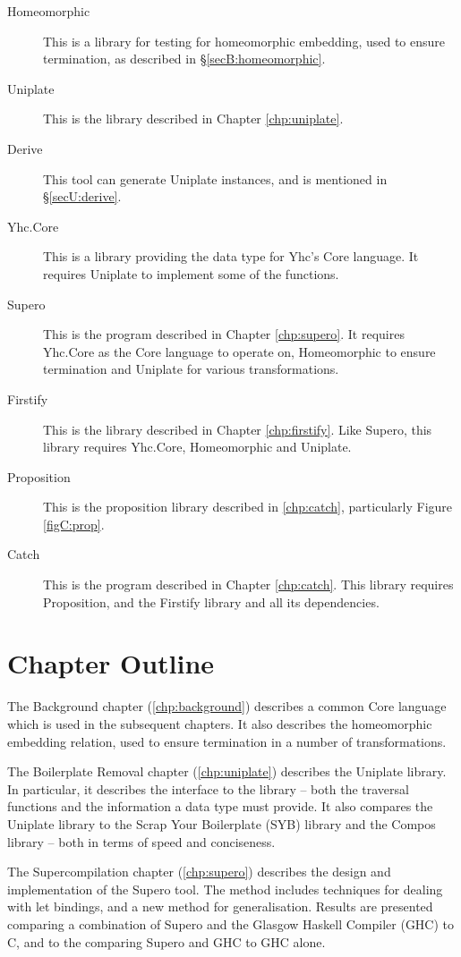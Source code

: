 \begin{description}
\item[Homeomorphic] This is a library for testing for homeomorphic embedding, used to ensure termination, as described in \S\ref{secB:homeomorphic}.
\item[Uniplate] This is the library described in Chapter \ref{chp:uniplate}.
\item[Derive] This tool can generate Uniplate instances, and is mentioned in \S\ref{secU:derive}.
\item[Yhc.Core] This is a library providing the data type for Yhc's Core language. It requires Uniplate to implement some of the functions.
\item[Supero] This is the program described in Chapter \ref{chp:supero}. It requires Yhc.Core as the Core language to operate on, Homeomorphic to ensure termination and Uniplate for various transformations.
\item[Firstify] This is the library described in Chapter \ref{chp:firstify}. Like Supero, this library requires Yhc.Core, Homeomorphic and Uniplate.
\item[Proposition] This is the proposition library described in \ref{chp:catch}, particularly Figure \ref{figC:prop}.
\item[Catch] This is the program described in Chapter \ref{chp:catch}. This library requires Proposition, and the Firstify library and all its dependencies.
\end{description}

\section{Chapter Outline}
\label{secI:chapters}

The Background chapter (\ref{chp:background}) describes a common Core language which is used in the subsequent chapters. It also describes the homeomorphic embedding relation, used to ensure termination in a number of transformations.

The Boilerplate Removal chapter (\ref{chp:uniplate}) describes the Uniplate library. In particular, it describes the interface to the library -- both the traversal functions and the information a data type must provide. It also compares the Uniplate library to the Scrap Your Boilerplate (SYB) library \cite{lammel:syb} and the Compos library \cite{bringert:compos} -- both in terms of speed and conciseness.

The Supercompilation chapter (\ref{chp:supero}) describes the design and implementation of the Supero tool. The method includes techniques for dealing with let bindings, and a new method for generalisation. Results are presented comparing a combination of Supero and the Glasgow Haskell Compiler (GHC) \cite{ghc} to C, and to the comparing Supero and GHC to GHC alone.

